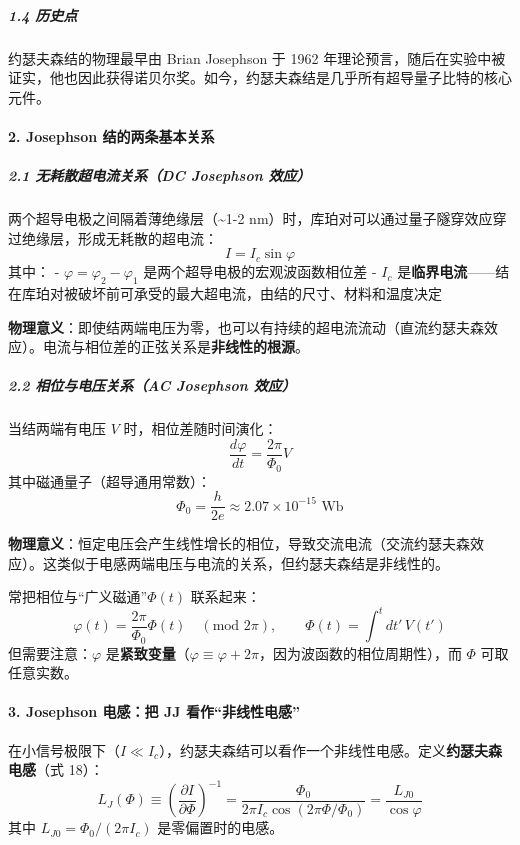 \documentclass[12pt,a4paper,oneside]{ctexbook}
\let\oldparagraph\paragraph
\renewcommand{\paragraph}[1]{\oldparagraph{#1}\mbox{}}
\let\oldsubparagraph\subparagraph
\renewcommand{\subparagraph}[1]{\oldsubparagraph{#1}\mbox{}}
\begin{document}
\subparagraph{1.4 历史点}\label{ux5386ux53f2ux70b9}

约瑟夫森结的物理最早由 Brian Josephson 于 1962
年理论预言，随后在实验中被证实，他也因此获得诺贝尔奖。如今，约瑟夫森结是几乎所有超导量子比特的核心元件。


\paragraph{2. Josephson
结的两条基本关系}\label{josephson-ux7ed3ux7684ux4e24ux6761ux57faux672cux5173ux7cfb}

\subparagraph{2.1 无耗散超电流关系（DC Josephson
效应）}\label{ux65e0ux8017ux6563ux8d85ux7535ux6d41ux5173ux7cfbdc-josephson-ux6548ux5e94}

两个超导电极之间隔着薄绝缘层（\textasciitilde{}1-2
nm）时，库珀对可以通过量子隧穿效应穿过绝缘层，形成无耗散的超电流：
\[I = I_c \sin\varphi\] 其中： - \(\varphi = \varphi_2 - \varphi_1\)
是两个超导电极的宏观波函数相位差 - \(I_c\)
是\textbf{临界电流}------结在库珀对被破坏前可承受的最大超电流，由结的尺寸、材料和温度决定

\textbf{物理意义}：即使结两端电压为零，也可以有持续的超电流流动（直流约瑟夫森效应）。电流与相位差的正弦关系是\textbf{非线性的根源}。

\subparagraph{2.2 相位与电压关系（AC Josephson
效应）}\label{ux76f8ux4f4dux4e0eux7535ux538bux5173ux7cfbac-josephson-ux6548ux5e94}

当结两端有电压 \(V\) 时，相位差随时间演化：
\[\frac{d\varphi}{dt} = \frac{2\pi}{\Phi_0}V\]
其中磁通量子（超导通用常数）：
\[\Phi_0 = \frac{h}{2e} \approx 2.07 \times 10^{-15} \text{ Wb}\]

\textbf{物理意义}：恒定电压会产生线性增长的相位，导致交流电流（交流约瑟夫森效应）。这类似于电感两端电压与电流的关系，但约瑟夫森结是非线性的。

常把相位与``广义磁通''\(\Phi(t)\) 联系起来：
\[\varphi(t) = \frac{2\pi}{\Phi_0}\Phi(t) \quad (\text{mod } 2\pi),\qquad \Phi(t) = \int^t dt'\,V(t')\]
但需要注意：\(\varphi\)
是\textbf{紧致变量}（\(\varphi \equiv \varphi + 2\pi\)，因为波函数的相位周期性），而
\(\Phi\) 可取任意实数。


\paragraph{3. Josephson 电感：把 JJ
看作``非线性电感''}\label{josephson-ux7535ux611fux628a-jj-ux770bux4f5cux975eux7ebfux6027ux7535ux611f}

在小信号极限下（\(I \ll I_c\)），约瑟夫森结可以看作一个非线性电感。定义\textbf{约瑟夫森电感}（式
18）：
\[L_J(\Phi) \equiv \left(\frac{\partial I}{\partial \Phi}\right)^{-1} = \frac{\Phi_0}{2\pi I_c \cos(2\pi\Phi/\Phi_0)} = \frac{L_{J0}}{\cos\varphi}\]
其中 \(L_{J0} = \Phi_0/(2\pi I_c)\) 是零偏置时的电感。
\end{document}

